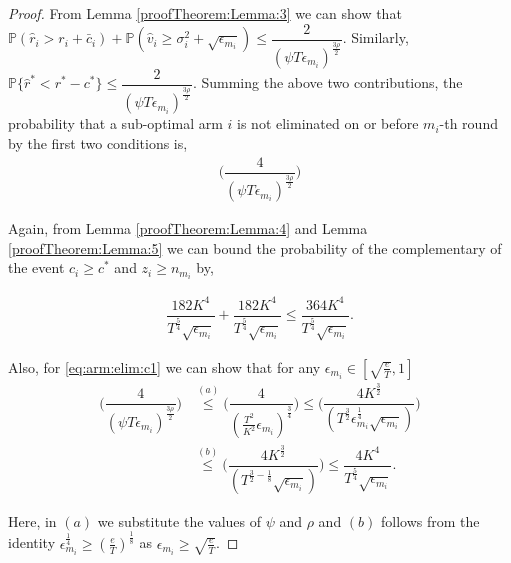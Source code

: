 \begin{proof}

From Lemma \ref{proofTheorem:Lemma:3} we can show that $\mathbb{P}\left( \hat{r}_{i} > r_{i}+ \bar{c}_i\right) + \mathbb{P}\left( \hat{v}_{i}\geq \sigma_{i}^{2}+\sqrt{\epsilon_{m_{i}}}\right) \leq \dfrac{2}{(\psi  T\epsilon_{m_{i}})^{\frac{3\rho}{2}}}$. Similarly, $\mathbb{P}\lbrace\hat{r}^{*} < r^{*} - c^{*}\rbrace \leq \dfrac{2}{(\psi  T\epsilon_{m_{i}})^{\frac{3\rho}{2}}}$. Summing the above two contributions, the probability that a sub-optimal arm ${i}$ is not eliminated on or before $m_{i}$-th round by the first two conditions is,  
\begin{eqnarray}
\bigg(\dfrac{4}{(\psi T\epsilon_{m_{i}})^{\frac{3\rho}{2}}} \bigg) \label{eq:arm:elim:c1}
\end{eqnarray}
 

Again, from Lemma \ref{proofTheorem:Lemma:4} and Lemma \ref{proofTheorem:Lemma:5} we can bound the probability of the  complementary of the event $c_{i} \geq c^* $ and $ z_i \geq n_{m_i}$ by,

\begin{eqnarray}
\dfrac{182 K^4}{T^{\frac{5}{4}}\sqrt{\epsilon_{m_i}}} + \dfrac{182 K^4}{T^{\frac{5}{4}}\sqrt{\epsilon_{m_i}}}\leq \dfrac{364 K^4}{T^{\frac{5}{4}}\sqrt{\epsilon_{m_i}}} \label{eq:arm:elim:c2}.
\end{eqnarray}

Also, for \ref{eq:arm:elim:c1} we can show that for any $\epsilon_{m_i}\in[\sqrt{\frac{e}{T}},1]$
\begin{align*}
\bigg(\dfrac{4}{(\psi T\epsilon_{m_{i}})^{\frac{3\rho}{2}}} \bigg) &\overset{(a)}{\leq} \bigg(\dfrac{4}{(\frac{T^2}{K^2}\epsilon_{m_{i}})^{\frac{3}{4}}} \bigg)\leq \bigg(\dfrac{4 K^{\frac{3}{2}}}{(T^\frac{3}{2} \epsilon_{m_i}^{\frac{1}{4}}\sqrt{\epsilon_{m_{i}}})}\bigg)\\
 &\overset{(b)}{\leq} \bigg(\dfrac{4 K^{\frac{3}{2}}}{(T^{\frac{3}{2}-\frac{1}{8}}\sqrt{\epsilon_{m_{i}}})}  \bigg)
\leq \dfrac{4 K^4}{T^{\frac{5}{4}}\sqrt{\epsilon_{m_i}}}.
\end{align*}

Here, in $(a)$ we substitute the values of $\psi$ and $\rho$ and $(b)$ follows from the identity $\epsilon_{m_i}^{\frac{1}{4}}\geq (\frac{e}{T})^{\frac{1}{8}} $ as $\epsilon_{m_i}\geq \sqrt{\frac{e}{T}}$.


\end{proof}
